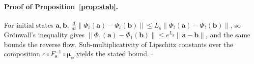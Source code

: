 \paragraph{Proof of Proposition~\ref{prop:stab}.}
For initial states $\mathbf{a},\mathbf{b}$,
$\frac{d}{dt}\lVert\Phi_t(\mathbf{a})-\Phi_t(\mathbf{b})\rVert
\le L_g\lVert\Phi_t(\mathbf{a})-\Phi_t(\mathbf{b})\rVert$, so Gr\"onwall's
inequality gives
$\lVert\Phi_1(\mathbf{a})-\Phi_1(\mathbf{b})\rVert
\le e^{L_g}\lVert\mathbf{a}-\mathbf{b}\rVert$, and the same bounds the reverse
flow. Sub-multiplicativity of Lipschitz constants over the composition
$c\circ F_\theta^{-1}\circ\boldsymbol{\mu}_\phi$ yields the stated bound.
\hfill$\square$
